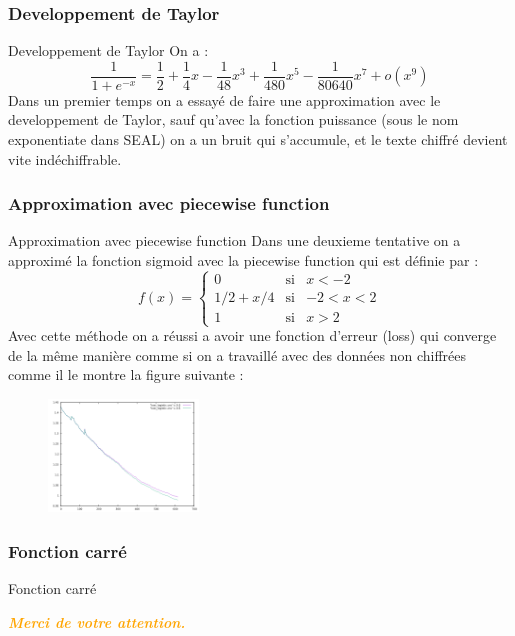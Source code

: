 \documentclass{beamer}
\begin{document}
\subsubsection{Developpement de Taylor}
\begin{frame}{Developpement de Taylor}
On a :
\newcommand\omicron{o}
 $$\dfrac{1}{1+e^{-x}} = \dfrac{1}{2} + \dfrac{1}{4}x - \dfrac{1}{48}x^3 + \dfrac{1}{480}x^5 - \dfrac{1}{80640}x^7 + \omicron(x^9)$$
Dans un premier temps on a essayé de faire une approximation avec le developpement de Taylor, sauf qu'avec la fonction puissance (sous le nom exponentiate dans SEAL) on a un bruit qui s'accumule, et le texte chiffré devient vite indéchiffrable. 
\end{frame}
\subsubsection{Approximation avec piecewise function}
\begin{frame}{Approximation avec piecewise function}
Dans une deuxieme tentative on a approximé la fonction sigmoid avec la piecewise function qui est définie par :\newline
 \begin{equation}
f(x)=
\left\lbrace
\begin{array}{ccc}
0  & \mbox{si} & x<-2\\
1/2 + x/4 & \mbox{si} & -2<x<2\\
1 & \mbox{si} & x>2
\end{array}\right.
\end{equation}
Avec cette méthode on a réussi a avoir une fonction d'erreur (loss) qui converge de la même manière comme si on a travaillé avec des données non chiffrées comme il le montre la figure suivante :
\begin{figure}[h!]\begin{center}
             \includegraphics[width=4cm]{loss_logistic_regression.png}
             \end{center}
             \end{figure}
\end{frame}
\subsubsection{Fonction carré}
\begin{frame}{Fonction carré}
\end{frame}
\begin{frame}
	\begin{center}
	\textcolor{orange}{\textbf{\textit{Merci de votre attention.}}}
	\end{center}
\end{frame}
\end{document}
